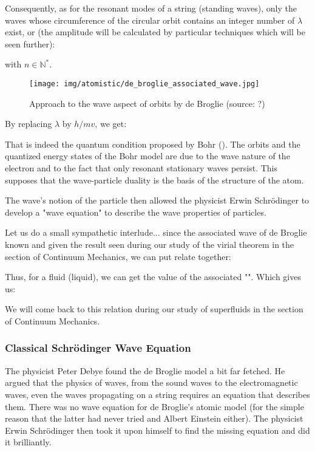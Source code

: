 	Consequently, as for the resonant modes of a string (standing waves), only the waves whose circumference of the circular orbit contains an integer number of $\lambda$ exist, or (the amplitude will be calculated by particular techniques which will be seen further):
	
	with $n\in\mathbb{N}^{*}$.
	\begin{figure}[H]
		\centering
		\texttt{[image: img/atomistic/de\_broglie\_associated\_wave.jpg]}
		\caption[Approach to the wave aspect of orbits by de Broglie]{Approach to the wave aspect of orbits by de Broglie (source: ?)}
	\end{figure}
	By replacing $\lambda$ by $h/mv$, we get:
	
	That is indeed the quantum condition proposed by Bohr (). The orbits and the quantized energy states of the Bohr model are due to the wave nature of the electron and to the fact that only resonant stationary waves persist. This supposes that the wave-particle duality is the basis of the structure of the atom.

	The wave's notion of the particle then allowed the physicist Erwin Schrödinger to develop a "wave equation" to describe the wave properties of particles.

	Let us do a small sympathetic interlude... since the associated wave of de Broglie known and given the result seen during our study of the virial theorem in the section of Continuum Mechanics, we can put relate together:
	
	Thus, for a fluid (liquid), we can get the value of the associated "". Which gives us:
	
	We will come back to this relation during our study of superfluids in the section of Continuum Mechanics.
	
	\pagebreak
	\subsubsection{Classical Schrödinger Wave Equation}\label{schrodinger wave equation}
	The physicist Peter Debye found the de Broglie model a bit far fetched. He argued that the physics of waves, from the sound waves to the electromagnetic waves, even the waves propagating on a string requires an equation that describes them. There was no wave equation for de Broglie's atomic model (for the simple reason that the latter had never tried and Albert Einstein either). The physicist Erwin Schrödinger then took it upon himself to find the missing equation and did it brilliantly.

